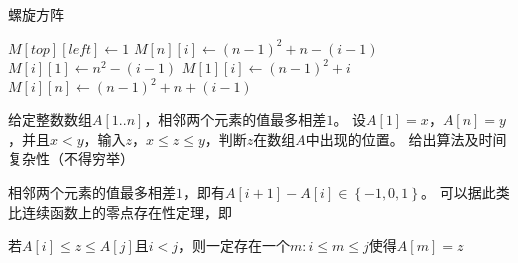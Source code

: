 \documentclass[answers]{exam}
\begin{document}
\begin{questions}
\begin{solution}
            \begin{algorithm}[H]
                \caption{螺旋方阵}
                \begin{algorithmic}[1]
                    \State {}
                    \Statex
                    \Statex
                    \State $M[top][left] \gets 1$
                     
                    \State {} 
                    \State $M[n][i] \gets (n-1)^2 + n - (i - 1)$ 
                    \State $M[i][1] \gets n^2 - (i - 1)$ 
                    \EndFor
                    \Else {}
                    \State {} 
                    \State $M[1][i] \gets (n-1)^2 + i$ 
                    \State $M[i][n] \gets (n-1)^2 + n + (i - 1)$ 
                    \EndFor
                    \EndIf
                    \EndProcedure
                \end{algorithmic}
            \end{algorithm}

        \end{solution}

        \newpage %

        \question 给定整数数组$A[1..n]$，相邻两个元素的值最多相差$1$。
        设$A[1]=x$，$A[n]=y$，并且$x<y$，输入$z$，$x \leq z \leq y$，判断$z$在数组$A$中出现的位置。
        给出算法及时间复杂性（不得穷举）

        \begin{solution}
            相邻两个元素的值最多相差$1$，即有$A[i+1] - A[i] \in \left\{-1, 0, 1\right\}$。
            可以据此类比连续函数上的零点存在性定理，即

            \begin{center}
                若$A[i] \leq z \leq A[j]$且$i < j$，则一定存在一个$m : i \leq m \leq j$使得$A[m] = z$
            \end{center}


\end{solution}
\end{questions}
\end{document}
